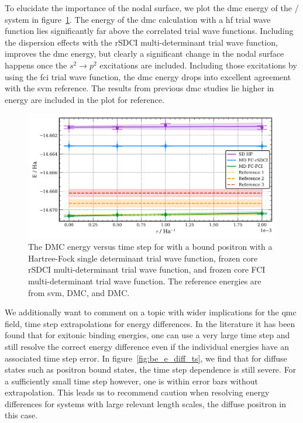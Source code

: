 To elucidate the importance of the nodal surface, we plot the \gls{dmc} energy of the / system in figure~\ref{fig:be_md_extrap}.
The energy of the \gls{dmc} calculation with a \gls{hf} trial wave function lies significantly far above the correlated trial wave functions.
Including the dispersion effects with the \gls{rSDCI} multi-determinant trial wave function, improves the \gls{dmc} energy, but clearly a significant change in the nodal surface happens once the $s^2\rightarrow p^2$ excitations are included.
Including those excitations by using the \gls{fci} trial wave function, the \gls{dmc} energy drops into excellent agreement with the \gls{svm} reference.
The results from previous \gls{dmc} studies lie higher in energy are included in the plot for reference.\cite{10.1021/acs.jctc.1c01193, 10.1063/1.1486447}

\begin{figure}
    \caption{\label{fig:be_md_extrap} The DMC energy versus time step for  with a bound positron with a Hartree-Fock single determinant trial wave function, frozen core rSDCI multi-determinant trial wave function, and frozen core FCI multi-determinant trial wave function. The reference energies are from \gls{svm}\cite{10.4208/jams.071510.072110a}, DMC\cite{10.1021/acs.jctc.1c01193}, and DMC\cite{10.1063/1.1486447}.
    }
    \includegraphics[width=\columnwidth,keepaspectratio]{Images/chapter5/be_extrap_multidet.png}
\end{figure}

We additionally want to comment on a topic with wider implications for the \gls{qmc} field, time step extrapolations for energy differences.
In the literature it has been found that for exitonic binding energies, one can use a very large time step and still resolve the correct energy difference even if the individual energies have an associated time step error.\cite{10.1103/PhysRevB.98.075122}
In figure~\ref{fig:be_e_diff_ts}, we find that for diffuse states such as positron bound states, the time step dependence is still severe.
For a sufficiently small time step however, one is within error bars without extrapolation.
This leads us to recommend caution when resolving energy differences for systems with large relevant length scales, the diffuse positron in this case.

